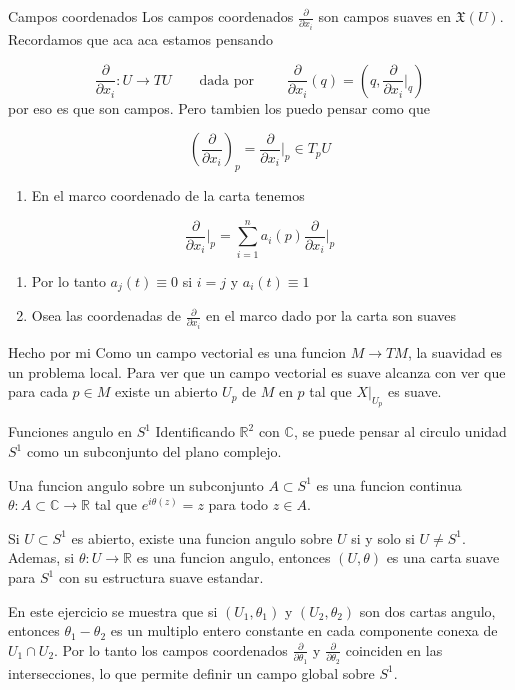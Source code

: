 \label{blk:f23a3b}
\begin{bookcorollary}{Campos coordenados}
Los campos coordenados $\frac{\partial}{\partial x_i}$ son campos suaves en $\mathfrak X(U)$. Recordamos que aca aca estamos pensando

\[
\frac{\partial}{\partial x_{i}}:U\rightarrow  TU\qquad \text{dada por }\qquad \frac{\partial}{\partial x_{i}}(q)=\left(q,\frac{\partial}{\partial x_{i}}\bigg|_{q}\right)
\]
por eso es que son campos. Pero tambien los puedo pensar como que

\[
\left(\frac{\partial}{\partial x_{i}}\right)_{p}=\frac{\partial}{\partial x_{i}}\bigg|_{p}\in T_{p}U
\]
\end{bookcorollary}
\begin{bookproof}{}
\begin{enumerate}
\item En el marco coordenado de la carta tenemos
\end{enumerate}
\[
\frac{\partial}{\partial x_{i}}\bigg|_{p}=\sum^{n}_{i=1}a_{i}(p)\frac{\partial}{\partial x_{i}}\bigg|_{p}
\]
\begin{enumerate}[start=2]
\item Por lo tanto $a_{j}(t)\equiv 0$ si $i=j$ y $a_{i}(t)\equiv 1$
\item Osea las coordenadas de $\frac{\partial}{\partial x_{i}}$ en el marco dado por la carta son suaves
\end{enumerate}
\bookqed
\end{bookproof}
\label{blk:4e6c26}
\begin{bookremark}{Hecho por mi}
Como un campo vectorial es una funcion $M \to TM$, la suavidad es un problema local. Para ver que un campo vectorial es suave alcanza con ver que para cada $p \in M$ existe un abierto $U_p$ de $M$ en $p$ tal que $X|_{U_p}$ es suave.

\end{bookremark}
\begin{bookexample}{Funciones angulo en $S^1$}
Identificando $\mathbb R^2$ con $\mathbb C$, se puede pensar al circulo unidad $S^1$ como un subconjunto del plano complejo.

Una funcion angulo sobre un subconjunto $A \subset S^1$ es una funcion continua $\theta:A \subset \mathbb C \to \mathbb R$ tal que $e^{i\theta(z)}=z$ para todo $z \in A$.

Si $U \subset S^1$ es abierto, existe una funcion angulo sobre $U$ si y solo si $U \neq S^1$. Ademas, si $\theta:U \to \mathbb R$ es una funcion angulo, entonces $(U,\theta)$ es una carta suave para $S^1$ con su estructura suave estandar.

En este ejercicio se muestra que si $(U_1,\theta_1)$ y $(U_2,\theta_2)$ son dos cartas angulo, entonces $\theta_1-\theta_2$ es un multiplo entero constante en cada componente conexa de $U_1 \cap U_2$. Por lo tanto los campos coordenados $\frac{\partial}{\partial \theta_1}$ y $\frac{\partial}{\partial \theta_2}$ coinciden en las intersecciones, lo que permite definir un campo global sobre $S^1$.

\end{bookexample}
